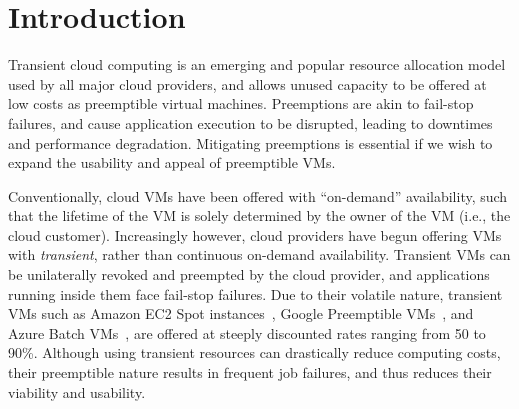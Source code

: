 \vspace*{\largesubsecspace}
\section{Introduction}
\label{sec:intro}








Transient cloud computing is an emerging and popular resource allocation model used by all major cloud providers, and allows unused capacity to be  offered at low costs as preemptible virtual machines. 
Preemptions are akin to fail-stop failures, and cause application execution to be disrupted, leading to downtimes and performance degradation. 
Mitigating preemptions is essential if we wish to expand the usability and appeal of preemptible VMs.


Conventionally, cloud VMs have been offered with ``on-demand'' availability, such that the lifetime of the VM is solely determined by the owner of the VM (i.e., the cloud customer). 
Increasingly however, cloud providers have begun offering VMs with \emph{transient}, rather than continuous on-demand availability. 
Transient VMs can be unilaterally revoked and preempted by the cloud provider, and applications running inside them face fail-stop failures. 
Due to their volatile nature, transient VMs such as Amazon EC2 Spot instances~\cite{spot-documentation}, Google Preemptible VMs~\cite{preemptible-documentation}, and Azure Batch VMs~\cite{azure-batch}, are offered at steeply discounted rates ranging from 50 to 90\%.
Although using transient resources can drastically reduce computing costs, their preemptible nature results in frequent job failures, and thus reduces their viability and usability. 

